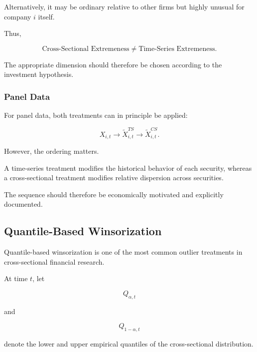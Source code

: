 \documentclass[11pt,a4paper]{article}
\begin{document}
Alternatively, it may be ordinary relative to other firms but highly unusual
for company $i$ itself.

Thus,

\begin{equation}
\boxed{
\text{Cross-Sectional Extremeness}
\neq
\text{Time-Series Extremeness}.
}
\end{equation}

The appropriate dimension should therefore be chosen according to the
investment hypothesis.


\subsubsection{Panel Data}

For panel data, both treatments can in principle be applied:

\begin{equation}
X_{i,t}
\rightarrow
\widetilde{X}_{i,t}^{TS}
\rightarrow
\widetilde{X}_{i,t}^{CS}.
\end{equation}

However, the ordering matters.

A time-series treatment modifies the historical behavior of each security,
whereas a cross-sectional treatment modifies relative dispersion across
securities.

The sequence should therefore be economically motivated and explicitly
documented.


\subsection{Quantile-Based Winsorization}
\label{subsec:quantile_winsorization}

Quantile-based winsorization is one of the most common outlier treatments in
cross-sectional financial research.

At time $t$, let

\begin{equation}
Q_{\alpha,t}
\end{equation}

and

\begin{equation}
Q_{1-\alpha,t}
\end{equation}

denote the lower and upper empirical quantiles of the cross-sectional
distribution.
\end{document}
